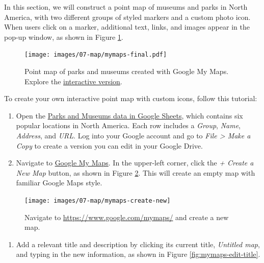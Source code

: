 \documentclass[
  english,
]{book}
\providecommand{\tightlist}{%
  \setlength{\itemsep}{0pt}\setlength{\parskip}{0pt}}
\begin{document}
In this section, we will construct a point map of museums and parks in North America, with two different groups of styled markers and a custom photo icon. When users click on a marker, additional text, links, and images appear in the pop-up window, as shown in Figure \ref{fig:mymaps-final}.



\begin{figure}
\centering
\texttt{[image: images/07-map/mymaps-final.pdf]}
\caption{\label{fig:mymaps-final}Point map of parks and museums created with Google My Maps. Explore the \href{https://www.google.com/maps/d/u/1/edit?mid=1W6VujVZzB1Y1D1tktLVhO99ZabyOZABr\&usp=sharing}{interactive version}.}
\end{figure}

To create your own interactive point map with custom icons, follow this tutorial:

\begin{enumerate}
\def\labelenumi{\arabic{enumi}.}
\item
  Open the \href{https://docs.google.com/spreadsheets/d/11nSoyGUxDJiBe5VZflDnaaqgWMdWyIUNnjNLMlGOPLk/edit\#gid=312385679}{Parks and Museums data in Google Sheets}, which contains six popular locations in North America. Each row includes a \emph{Group}, \emph{Name}, \emph{Address}, and \emph{URL}. Log into your Google account and go to \emph{File \textgreater{} Make a Copy} to create a version you can edit in your Google Drive.
\item
  Navigate to \href{https://www.google.com/mymaps/}{Google My Maps}. In the upper-left corner, click the \emph{+ Create a New Map} button, as shown in Figure \ref{fig:mymaps-create-new}. This will create an empty map with familiar Google Maps style.
\end{enumerate}



\begin{figure}
\texttt{[image: images/07-map/mymaps-create-new]} \caption{Navigate to \url{https://www.google.com/mymaps/} and create a new map.}\label{fig:mymaps-create-new}
\end{figure}

\begin{enumerate}
\def\labelenumi{\arabic{enumi}.}
\setcounter{enumi}{2}
\tightlist
\item
  Add a relevant title and description by clicking its current title, \emph{Untitled map}, and typing in the new information, as shown in Figure \ref{fig:mymaps-edit-title}.
\end{enumerate}
\end{document}
